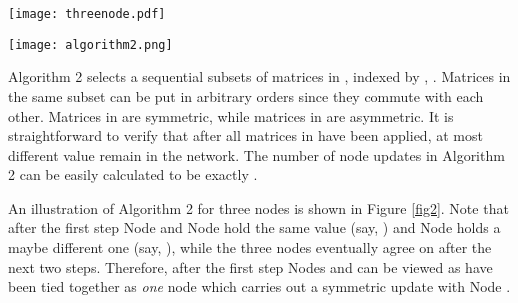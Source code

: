 \documentclass[a4paper, 11pt]{article}
\begin{document}
\begin{algorithm}[htb]
\caption{Fastest Finite-time Convergence via  Symmetric/Asymmetric Gossiping}
\label{alg:Framwork}
\begin{algorithmic}[1]
\STATE 
\STATE 
\FOR{}
        \STATE 
        \STATE 
    \ENDFOR
\FOR{}
    \STATE  
    \FOR{}
        \STATE 
        \STATE 
    \ENDFOR
    \STATE 
    \FOR{}
        \STATE 
        \STATE 
    \ENDFOR
\ENDFOR
\RETURN 
\end{algorithmic}
\end{algorithm}

\begin{figure*}[t]
\begin{center}
\texttt{[image: threenode.pdf]}
\caption{An illustration of Algorithm 2 for three nodes. Each directed arc represents selected node pairs and only the head nodes update their states. Using three steps and five node updates, the three nodes reach the same state. } \label{fig2}
\end{center}
\end{figure*}

\begin{figure*}[t]
\begin{center}
\texttt{[image: algorithm2.png]}
\caption{{An illustration of Algorithm 2 for  nodes. Divide the  nodes into two subgroups with  nodes in each of the group. Tie the rest of  nodes pairwise with another  nodes in one of the group. Then apply the above three-node arrangement to the pair of nodes with another node selected from the remaining group so that Algorithm 1 can be repeated.  Finite-time convergence is therefore achieved and it turns out this is the fastest algorithm in terms of number of node updates.}   } \label{fig5}
\end{center}
\end{figure*}


Algorithm 2 selects a sequential subsets of matrices in , indexed by , .  Matrices in the same subset can be put in arbitrary orders since they commute with each other. Matrices in  are symmetric, while matrices in  are asymmetric. It is straightforward  to verify that after all matrices in  have been applied,   at most  different value  remain  in the network. The number of node updates in Algorithm 2 can be easily calculated to be exactly .

An illustration of Algorithm 2 for three nodes is shown in Figure \ref{fig2}. Note that after the first step  Node  and Node  hold the same value (say, ) and Node  holds a maybe different one (say, ),  while the three nodes eventually agree on  after the next  two steps. Therefore, after the first step Nodes  and  can be viewed as have been tied together as {\it one} node  which carries out a symmetric update with Node .
\end{document}
